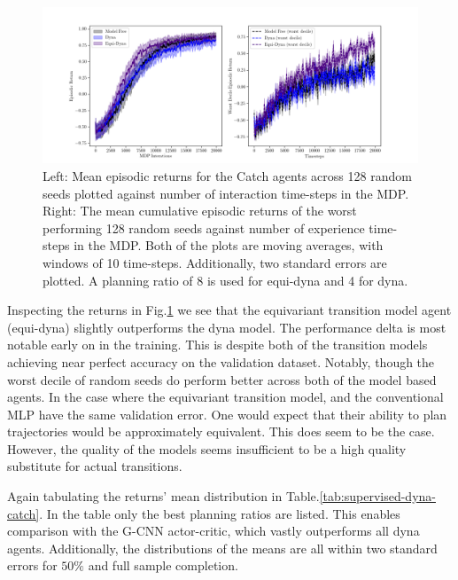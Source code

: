 \begin{figure}
	\centering
	\includegraphics[width=\textwidth]{Figures/Expert_Dyna_Catch_pr2.png}
	\caption{Left: Mean episodic returns for the Catch agents across 128 random seeds
		plotted against number of interaction time-steps in the MDP. Right: The mean
		cumulative episodic returns of the worst performing 128 random seeds against
		number of experience time-steps in the MDP. Both of the plots are moving
		averages, with windows of 10 time-steps. Additionally, two standard errors are
		plotted. A planning ratio of 8 is used for equi-dyna and 4 for dyna.}
	\label{fig:supervised-dyna-catch}
\end{figure}

Inspecting the returns in Fig.\ref{fig:supervised-dyna-catch} we see that the equivariant transition model agent (equi-dyna) slightly outperforms the dyna model. The performance delta is most notable early on in the training. This is despite both of the transition models achieving near perfect accuracy on the validation dataset. Notably, though the worst decile of random seeds do perform better across both of the model based agents. In the case where the equivariant transition model, and the conventional MLP have the same validation error. One would expect that their ability to plan trajectories would be approximately equivalent. This does seem to be the case. However, the quality of the models seems insufficient to be a high quality substitute for actual transitions.

Again tabulating the returns' mean distribution in Table.\ref{tab:supervised-dyna-catch}. In the table only the best planning ratios are listed. This enables comparison with the G-CNN actor-critic, which vastly outperforms all dyna agents. Additionally, the distributions of the means are all within two standard errors for $50 \%$ and full sample completion.

